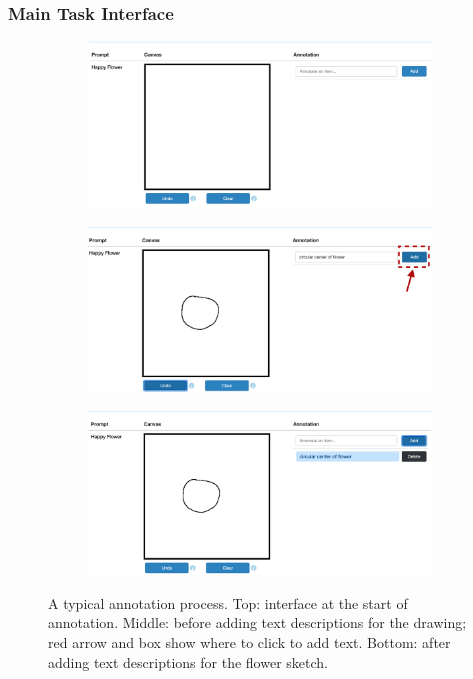 \subsubsection{Main Task Interface}

\begin{figure}[!htb]
\begin{subfigure}{\textwidth}
    \centering
    \includegraphics[width=.75\linewidth]{data_collection/v1_empty_table.png}  
\end{subfigure}
\newline
\begin{subfigure}{\textwidth}
    \centering
    \includegraphics[width=.75\linewidth]{data_collection/v1_before_enter_text.png}  
\end{subfigure}
\newline
\begin{subfigure}{\textwidth}
    \centering
    \includegraphics[width=.75\linewidth]{data_collection/v1_after_enter_text.png}  
\end{subfigure}
\caption{A typical annotation process. Top: interface at the start of annotation. Middle: before adding text descriptions for the drawing; red arrow and box show where to click to add text. Bottom: after adding text descriptions for the flower sketch.}
\label{v1.main_task.1}
\end{figure}

